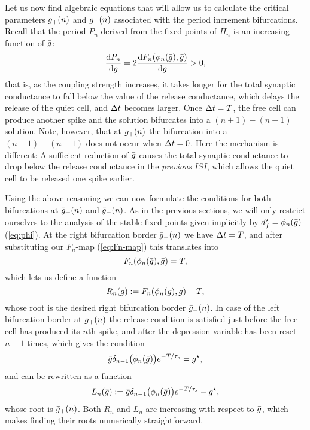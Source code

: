 \documentclass[../manuscript.tex]{subfiles}
\begin{document}
Let us now find algebraic equations that will allow us to calculate the critical parameters $\bar g_+(n)$ and $\bar g_-(n)$ associated with the period increment bifurcations.
Recall that the period $P_n$ derived from the fixed points of $\Pi_n$ is an increasing function of $\bar g$:
\begin{equation}
  \dv{P_{n}}{\bar g}=2\dv{F_n(\phi_n(\bar g), \bar g)}{\bar g}>0,
\end{equation}
that is, as the coupling strength increases, it takes longer for the total synaptic conductance to fall below the value of the release conductance, which delays the release of the quiet cell, and $\Delta t$ becomes larger.
Once $\Delta t=T$, the free cell can produce another spike and the solution bifurcates into a $(n+1)-(n+1)$ solution.
Note, however, that at $\bar g_+(n)$ the bifurcation into a $(n-1)-(n-1)$ does not occur when $\Delta t=0$.
Here the mechanism is different: A sufficient reduction of $\bar g$ causes the total synaptic conductance to drop below the release conductance in the \emph{previous} $ISI$, which allows the quiet cell to be released one spike earlier.

Using the above reasoning we can now formulate the conditions for both bifurcations at $\bar g_+(n)$ and $\bar g_-(n)$.
As in the previous sections, we will only restrict ourselves to the analysis of the stable fixed points given implicitly by $d^\star_f=\phi_n(\bar g)$ (\cref{eq:phi}).
At the right bifurcation border $\bar g_-(n)$ we have $\Delta t=T$, and after substituting our $F_{n}$-map (\cref{eq:Fn-map}) this translates into
\begin{equation}
  F_n(\phi_n(\bar g), \bar g) = T,
\end{equation}
which lets us define a function
\begin{equation}
  \label{eq:R}
  R_{n}(\bar g):=F_n(\phi_n(\bar g), \bar g)-T,
\end{equation}
whose root is the desired right bifurcation border $\bar g_-(n)$.
In case of the left bifurcation border at $\bar g_+(n)$ the release condition is satisfied just before the free cell has produced its $n$th spike, and after the depression variable has been reset $n-1$ times, which gives the condition
\begin{equation}
  \bar g \delta_{n-1}\big(\phi_{n}(\bar g)\big)e^{-T/\tau_s} = g^\star,
\end{equation}
and can be rewritten as a function
\begin{equation}
  \label{eq:L}
  L_{n}(\bar g):=\bar g \delta_{n-1}\big(\phi_{n}(\bar g)\big)e^{-T/\tau_s} -g^\star,
\end{equation}
whose root is $\bar g_+(n)$.
Both $R_{n}$ and $L_{n}$ are increasing with respect to $\bar g$, which makes finding their roots numerically straightforward.
\end{document}
